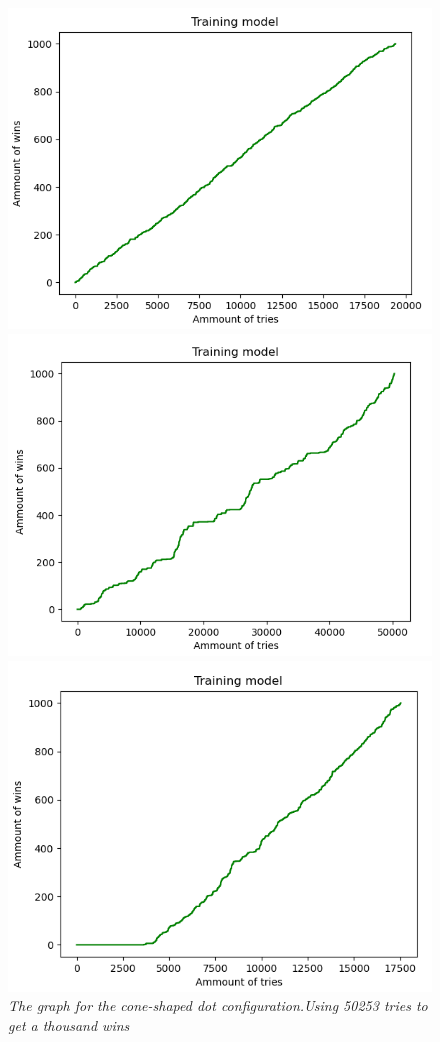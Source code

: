 \begin{figure}[H] \centering
    \includegraphics[scale=0.47]{Billeder/2-punkt 19362.PNG}
    \caption{}
    \includegraphics[scale=0.47]{Billeder/Keglesnit 50253.PNG}
    \caption{\textit{The graph for the cone-shaped dot configuration.Using 50253 tries to get a thousand wins}}
    \includegraphics[scale=0.47]{Billeder/Halvcirkel 17538.PNG}

\end{figure}
